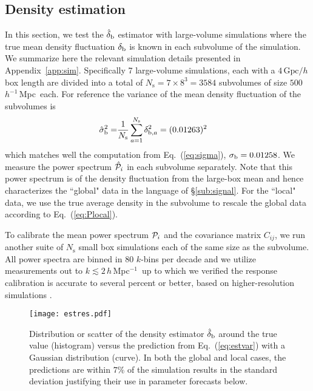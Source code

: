 \documentclass[prd,twocolumn,amsmath,amssymb,floatfix,superscriptaddress]{revtex4-1}
\newcommand{\br}{{\rm b}}
\newcommand{\hMpci}{$h\,$Mpc$^{-1}$}
\newcommand{\hiMpc}{$h^{-1}\,$Mpc}
\newcommand{\Dv}{{\cal P}}
\begin{document}
{\subsection{Density estimation}
\label{sub:sigtest}


In this section, we test the $\hat \delta_\br$ estimator with large-volume simulations where the true 
mean density fluctuation $\delta_\br$ is known in each subvolume of the
simulation.
We summarize here the relevant simulation details presented in 
Appendix~{\ref{app:sim}}.
Specifically 7 large-volume simulations, each with a $4\,\textrm{Gpc}/h$ box length
are divided into a total of $N_\textrm{s}=7\times8^3=3584$ subvolumes of
size $500\,$\hiMpc\ each.  For reference the variance of the mean density fluctuation of the
subvolumes is
\begin{align}
\hat \sigma^2_{\br} = &   \frac{1}{N_\textrm{s}} \sum_{a=1}^{N_\textrm{s}} \delta_{\br,a}^2 = (0.01263)^2
\end{align}
 which matches well the computation from 
Eq.~(\ref{eq:sigma}), {$\sigma_\br=0.01258$}.
We measure the power spectrum {$\hat \Dv_i$}
in each subvolume separately.
Note that this power spectrum is  of the density fluctuation from the large-box mean and
hence  characterizes the ``global" data in the language of \S \ref{sub:signal}.   For the ``local"
data, we use the true average density in the subvolume
 to rescale the global data according to Eq.~(\ref{eq:Plocal}).
 

To calibrate the mean power spectrum $\Dv_i$ and the covariance matrix $C_{ij}$,
we run another suite of $N_\textrm{s}$ small box simulations each of the same size as the subvolume.
All power spectra are binned in $80$ $k$-bins per decade and we utilize
measurements 
out to $k\lesssim2\,$\hMpci\ {up to which we verified 
the response calibration is
accurate to several percent or better, based on
 higher-resolution simulations
\citep{Lietal:14}.}


\begin{figure}[tb]
\centering
    \texttt{[image: estres.pdf]}
    \caption{
Distribution or scatter of the density estimator $\hat\delta_\br$ around the true value  (histogram) versus the prediction from  Eq.~(\ref{eq:estvar}) with a Gaussian distribution
        (curve).   In both the global and local cases, the predictions
 are within $7\%$ of the simulation results in 
{the}
standard deviation justifying their use in parameter forecasts below.
    }
    \label{fig:estres}
\end{figure}

}
\end{document}
